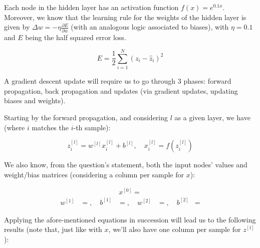 \documentclass[12pt]{article}
\begin{document}
\begin{enumerate}[leftmargin=\labelsep]
        Each node in the hidden layer has an activation function $f(x) = e^{0.1x}$.
        Moreover, we know that the learning rule for the weights of the hidden layer
        is given by $\Delta w = - \eta \frac{\partial E}{\partial w}$ (with an analogous
        logic associated to biases), with $\eta = 0.1$ and $E$ being the half squared error loss.

        \begin{equation*}
          E = \frac{1}{2} \sum_{i=1}^N (z_i - \hat{z}_i)^2
        \end{equation*}

        A gradient descent update will require us to go through 3 phases: forward
        propagation, back propagation and updates (via gradient updates, updating
        biases and weights).

        Starting by the forward propagation, and considering $l$ as a given layer,
        we have (where $i$ matches the $i$-th sample):

        \begin{equation*}
          z_i^{[l]} = w^{[l]} x_i^{[l]} + b^{[l]}, \quad x_i^{[l]} = f(z_i^{[l]})
        \end{equation*}

        We also know, from the question's statement, both the input nodes' values
        and weight/bias matrices (considering a column per sample for $x$):

        \begin{equation*}
          \begin{aligned}
            x^{[0]} = 
          \end{aligned}
        \end{equation*}
        \begin{equation*}
          \begin{aligned}
            w^{[1]} & = , \quad
            b^{[1]} & = , \quad
            w^{[2]} & = , \quad
            b^{[2]} & = 
          \end{aligned}
        \end{equation*}

        \pagebreak

        Applying the afore-mentioned equations in succession will lead us to the following results
        (note that, just like with $x$, we'll also have one column per sample
        for $z^{[l]}$):



\end{enumerate}
\end{document}

